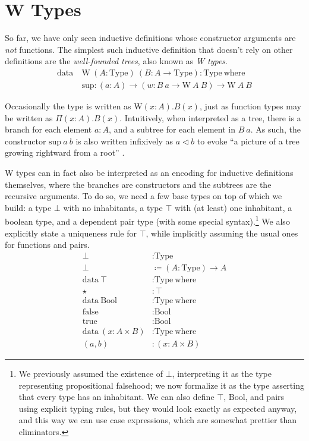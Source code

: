 \documentclass{report}
\newcommand{\Bool}{\const{Bool}}
\newcommand{\true}{\const{true}}
\newcommand{\false}{\const{false}}
\newcommand{\W}{\const{W}}
\renewcommand{\sup}{\const{sup}}
\newcommand{\const}[1]{\text{#1}}
\newcommand{\data}{\const{data}}
\newcommand{\Type}{\const{Type}}
\newcommand{\where}{\const{where}}
\begin{document}
\section{W Types}\label{wtypes}

So far, we have only seen inductive definitions whose constructor arguments are \emph{not} functions. The simplest such inductive definition that doesn't rely on other definitions are the \emph{well-founded trees}, also known as \emph{W types}.
%
\begin{align*}
    \data ~ &\W ~ (A : \Type) ~ (B: A \to \Type): \Type ~ \where \\
    &\const{sup}: (a: A) \to (w: B ~ a \to \W ~ A ~ B) \to \W ~ A ~ B
\end{align*}

Occasionally the type is written as $\W (x: A). B(x)$, just as function types may be written as $\Pi (x: A). B(x)$. Intuitively, when interpreted as a tree, there is a branch for each element $a: A$, and a subtree for each element in $B ~ a$. As such, the constructor $\sup ~ a ~ b$ is also written infixively as $a \lhd b$ to evoke ``a picture of a tree growing rightward from a root'' \citep{mcbride-wtype}.

W types can in fact also be interpreted as an encoding for inductive definitions themselves, where the branches are constructors and the subtrees are the recursive arguments. To do so, we need a few base types on top of which we build: a type $\bot$ with no inhabitants, a type $\top$ with (at least) one inhabitant, a boolean type, and a dependent pair type (with some special syntax).\footnote{We previously assumed the existence of $\bot$, interpreting it as the type representing propositional falsehood; we now formalize it as the type asserting that every type has an inhabitant. We can also define $\top$, $\Bool$, and pairs using explicit typing rules, but they would look exactly as expected anyway, and this way we can use case expressions, which are somewhat prettier than eliminators.} We also explicitly state a uniqueness rule for $\top$, while implicitly assuming the usual ones for functions and pairs.
%
\begin{align*}
    \bot &: \Type \\
    \bot &\coloneqq (A: \Type) \to A \\
    \data ~ \top &: \Type ~ \where \\
    \star &: \top \\
    \data ~ \Bool &: \Type ~ \where \\
    \false &: \Bool \\
    \true &: \Bool \\
    \data ~ (x: A \times B) &: \Type ~ \where \\
    (a, b) &: (x: A \times B)
\end{align*}
\begin{mathpar}
\end{mathpar}
\end{document}

